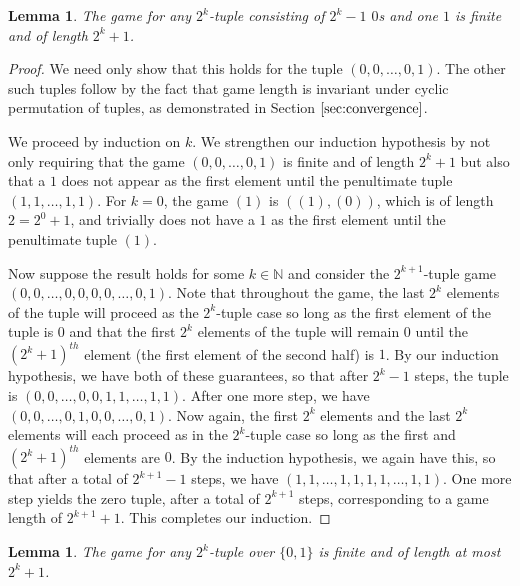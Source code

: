 \documentclass[12pt]{amsart}
\newtheorem{lemma}[theorem]{Lemma}
\newcommand{\znn}{\mathbb{N}}
\begin{document}
\begin{lemma}
The game for any $2^k$-tuple consisting of $2^k-1$ $0$s and one $1$ is finite and of length $2^k+1$.
\end{lemma}

\begin{proof}
We need only show that this holds for the tuple $(0,0,\ldots,0,1)$. The other such tuples follow by the fact that game length is invariant under cyclic permutation of tuples, as demonstrated in Section $\ref{sec:convergence}$.

We proceed by induction on $k$. We strengthen our induction hypothesis by not only requiring that the game $(0,0,\ldots,0,1)$ is finite and of length $2^k+1$ but also that a $1$ does not appear as the first element until the penultimate tuple $(1,1,\ldots,1,1)$. For $k=0$, the game $(1)$ is $((1),(0))$, which is of length $2=2^0+1$, and trivially does not have a $1$ as the first element until the penultimate tuple $(1)$.

Now suppose the result holds for some $k\in \znn$ and consider the $2^{k+1}$-tuple game $(0,0,\ldots,0,0,0,0,\ldots,0,1)$. Note that throughout the game, the last $2^k$ elements of the tuple will proceed as the $2^k$-tuple case so long as the first element of the tuple is $0$ and that the first $2^k$ elements of the tuple will remain $0$ until the $(2^k+1)^{th}$ element (the first element of the second half) is $1$. By our induction hypothesis, we have both of these guarantees, so that after $2^k-1$ steps, the tuple is $(0,0,\ldots,0,0,1,1,\ldots,1,1)$. After one more step, we have $(0,0,\ldots,0,1,0,0,\ldots,0,1)$. Now again, the first $2^k$ elements and the last $2^k$ elements will each proceed as in the $2^k$-tuple case so long as the first and $(2^k+1)^{th}$ elements are $0$. By the induction hypothesis, we again have this, so that after a total of $2^{k+1}-1$ steps, we have $(1,1,\ldots,1,1,1,1,\ldots,1,1)$. One more step yields the zero tuple, after a total of $2^{k+1}$ steps, corresponding to a game length of $2^{k+1}+1$. This completes our induction.
\end{proof}

\begin{lemma}
The game for any $2^k$-tuple over $\{0,1\}$ is finite and of length at most $2^k+1$.
\end{lemma}
\end{document}
